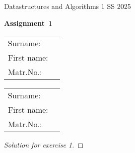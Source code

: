 \documentclass[9pt]{article}
\def\surname{}
\def\firstname{}
\def\matriculationnumber{}
\def\surnameB{}
\def\firstnameB{}
\def\matriculationnumberB{}
\begin{document}
{\sc Datastructures and Algorithms 1 \hfill SS 2025}\\[.1cm]


\begin{center}
{\Large\bf  
Assignment~$1$}\\

\end{center}

{\bf
\vspace{1ex}
\hspace{-1ex}\begin{tabular}{ll}
Surname: & \surname  \\
First name: & \firstname \\
Matr.No.: & \matriculationnumber  \\
\end{tabular}
}

{\bf
\vspace{1ex}
\hspace{-1ex}\begin{tabular}{ll}
Surname: & \surnameB  \\
First name: & \firstnameB \\
Matr.No.: & \matriculationnumberB  \\
\end{tabular}
}

\begin{proof}[Solution for exercise 1]
    
\end{proof}
\end{document}
